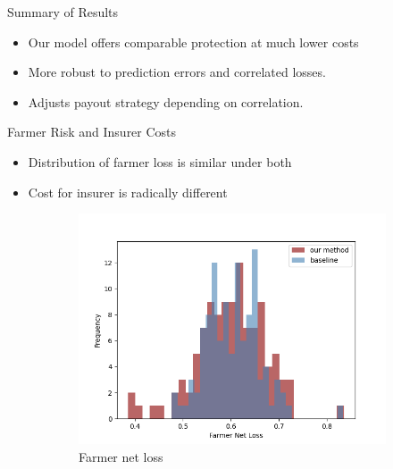 \documentclass{beamer}
\begin{document}
\begin{frame}{Summary of Results}
\begin{itemize}
    \setlength\itemsep{2em}
    \item Our model offers comparable protection at much lower costs 
    \item More robust to prediction errors and correlated losses. 
    \item Adjusts payout strategy depending on correlation. 
\end{itemize}
\end{frame}

\begin{frame}{Farmer Risk and Insurer Costs}
\begin{itemize}
    \item Distribution of farmer loss is similar under both
    \item Cost for insurer is radically different
\end{itemize}
\begin{figure}
\centering
  \begin{subfigure}[b]{0.47\textwidth}
    \includegraphics[width=\textwidth]{../../../output/figures/Logit_Bootstrap/farmer_loss_hist_no_corr_linear.png}
    \caption{Farmer net loss}
  \end{subfigure}
 \hfill
  \begin{subfigure}[b]{0.47\textwidth}

\end{subfigure}
\end{figure}
\end{frame}
\end{document}
